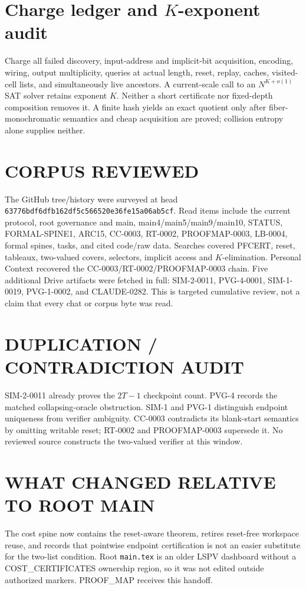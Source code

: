\documentclass[11pt]{article}
\begin{document}
\section{Charge ledger and \(K\)-exponent audit}
Charge all failed discovery, input-address and implicit-bit acquisition,
encoding, wiring, output multiplicity, queries at actual length, reset,
replay, caches, visited-cell lists, and simultaneously live ancestors.  A
current-scale call to an \(N^{K+o(1)}\) SAT solver retains exponent \(K\).
Neither a short certificate nor fixed-depth composition removes it.  A
finite hash yields an exact quotient only after fiber-monochromatic semantics
and cheap acquisition are proved; collision entropy alone supplies neither.

\section{CORPUS REVIEWED}
The GitHub tree/history were surveyed at head
\texttt{63776bdf6dfb162df5c566520e36fe15a06ab5cf}.  Read items include the
current protocol, root governance and main, main4/main5/main9/main10, STATUS,
FORMAL-SPINE1, ARC15, CC-0003, RT-0002, PROOFMAP-0003, LB-0004, formal
spines, tasks, and cited code/raw data.  Searches covered PFCERT, reset,
tableaux, two-valued covers, selectors, implicit access and \(K\)-elimination.
Personal Context recovered the CC-0003/RT-0002/PROOFMAP-0003 chain.  Five
additional Drive artifacts were fetched in full: SIM-2-0011, PVG-4-0001,
SIM-1-0019, PVG-1-0002, and CLAUDE-0282.  This is targeted cumulative review,
not a claim that every chat or corpus byte was read.

\section{DUPLICATION / CONTRADICTION AUDIT}
SIM-2-0011 already proves the \(2T-1\) checkpoint count.  PVG-4 records the
matched collapsing-oracle obstruction.  SIM-1 and PVG-1 distinguish endpoint
uniqueness from verifier ambiguity.  CC-0003 contradicts its blank-start
semantics by omitting writable reset; RT-0002 and PROOFMAP-0003 supersede it.
No reviewed source constructs the two-valued verifier at this window.

\section{WHAT CHANGED RELATIVE TO ROOT MAIN}
The cost spine now contains the reset-aware theorem, retires reset-free
workspace reuse, and records that pointwise endpoint certification is not an
easier substitute for the two-list condition.  Root \texttt{main.tex} is an
older LSPV dashboard without a COST\_CERTIFICATES ownership region, so it was
not edited outside authorized markers.  PROOF\_MAP receives this handoff.
\end{document}

